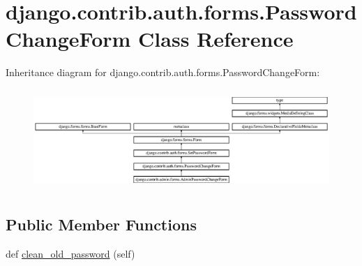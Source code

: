 \hypertarget{classdjango_1_1contrib_1_1auth_1_1forms_1_1_password_change_form}{}\section{django.\+contrib.\+auth.\+forms.\+Password\+Change\+Form Class Reference}
\label{classdjango_1_1contrib_1_1auth_1_1forms_1_1_password_change_form}
Inheritance diagram for django.\+contrib.\+auth.\+forms.\+Password\+Change\+Form\+:\begin{figure}[H]
\begin{center}
\leavevmode
\includegraphics[height=3.843138cm]{classdjango_1_1contrib_1_1auth_1_1forms_1_1_password_change_form}
\end{center}
\end{figure}
\subsection*{Public Member Functions}
\begin{DoxyCompactItemize}
\item 
def \mbox{\hyperlink{classdjango_1_1contrib_1_1auth_1_1forms_1_1_password_change_form_aecd5a680ca04ee9fdc6995595dbb4640}{clean\+\_\+old\+\_\+password}} (self)
\end{DoxyCompactItemize}
